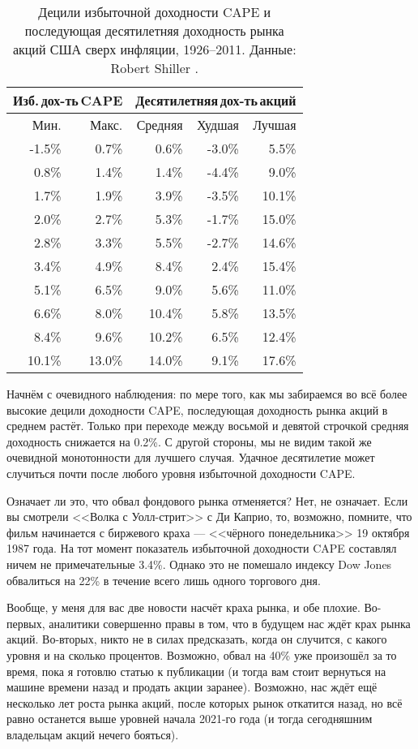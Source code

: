 \begin{table}[ht]
\centering
\begin{tabular}{r|r|r|r|r}
\multicolumn{2}{c|}{Изб.\,дох-ть\,CAPE} &
\multicolumn{3}{c}{Десятилетняя\,дох-ть\,акций} \\
\hline
Мин. & Макс. & Средняя & Худшая & Лучшая \\
\hline
-1.5\% &  0.7\% &  0.6\% & -3.0\% &  5.5\% \\
 0.8\% &  1.4\% &  1.4\% & -4.4\% &  9.0\% \\
 1.7\% &  1.9\% &  3.9\% & -3.5\% & 10.1\% \\
 2.0\% &  2.7\% &  5.3\% & -1.7\% & 15.0\% \\
\hline
 2.8\% &  3.3\% &  5.5\% & -2.7\% & 14.6\% \\
\hline
 3.4\% &  4.9\% &  8.4\% &  2.4\% & 15.4\% \\
 5.1\% &  6.5\% &  9.0\% &  5.6\% & 11.0\% \\
 6.6\% &  8.0\% & 10.4\% &  5.8\% & 13.5\% \\
 8.4\% &  9.6\% & 10.2\% &  6.5\% & 12.4\% \\
10.1\% & 13.0\% & 14.0\% &  9.1\% & 17.6\%        
\end{tabular}
\caption{Децили избыточной доходности CAPE и последующая десятилетняя доходность рынка акций США сверх инфляции, 1926--2011. Данные: Robert Shiller \cite{shillerOnline}.}
\label{cape_excess_yield_and_stock_returns_table}
\end{table}

Начнём с очевидного наблюдения: по мере того, как мы забираемся во всё более высокие децили доходности CAPE, последующая доходность рынка акций в среднем растёт. Только при переходе между восьмой и девятой строчкой средняя доходность снижается на 0.2\%. С другой стороны, мы не видим такой же очевидной монотонности для лучшего случая. Удачное десятилетие может случиться почти после любого уровня избыточной доходности CAPE.

Означает ли это, что обвал фондового рынка отменяется? Нет, не означает. Если вы смотрели <<Волка с Уолл-стрит>> с Ди Каприо, то, возможно, помните, что фильм начинается с биржевого краха --- <<чёрного понедельника>> 19 октября 1987 года. На тот момент показатель избыточной доходности CAPE составлял ничем не примечательные 3.4\%. Однако это не помешало индексу Dow Jones обвалиться на 22\% в течение всего лишь одного торгового дня. 

Вообще, у меня для вас две новости насчёт краха рынка, и обе плохие. Во-первых, аналитики совершенно правы в том, что в будущем нас ждёт крах рынка акций. Во-вторых, никто не в силах предсказать, когда он случится, с какого уровня и на сколько процентов. Возможно, обвал на 40\% уже произошёл за то время, пока я готовлю статью к публикации (и тогда вам стоит вернуться на машине времени назад и продать акции заранее). Возможно, нас ждёт ещё несколько лет роста рынка акций, после которых рынок откатится назад, но всё равно останется выше уровней начала 2021-го года (и тогда сегодняшним владельцам акций нечего бояться).

